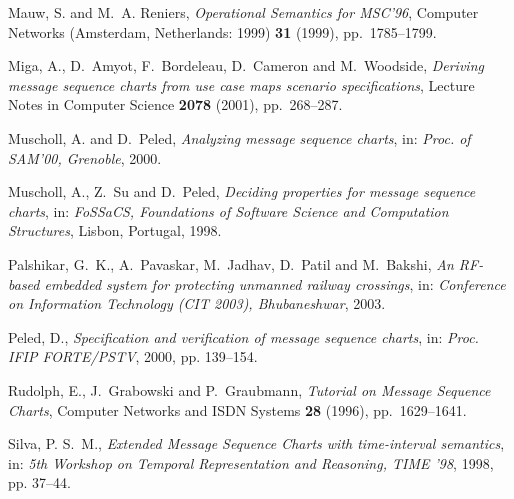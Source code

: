 \documentclass{entcs}
\begin{document}
\begin{thebibliography}{10}
Mauw, S. and M.~A. Reniers, \emph{Operational {Semantics} for {MSC'96}},
  Computer Networks (Amsterdam, Netherlands: 1999) \textbf{31} (1999),
  pp.~1785--1799.

Miga, A., D.~Amyot, F.~Bordeleau, D.~Cameron and M.~Woodside, \emph{Deriving
  message sequence charts from use case maps scenario specifications}, Lecture
  Notes in Computer Science \textbf{2078} (2001), pp.~268--287.

Muscholl, A. and D.~Peled, \emph{Analyzing message sequence charts}, in:
  \emph{Proc. of SAM'00, Grenoble}, 2000.

Muscholl, A., Z.~Su and D.~Peled, \emph{Deciding properties for message
  sequence charts}, in: \emph{FoSSaCS, Foundations of Software Science and
  Computation Structures}, Lisbon, Portugal, 1998.

Palshikar, G.~K., A.~Pavaskar, M.~Jadhav, D.~Patil and M.~Bakshi, \emph{An
  {RF}-based embedded system for protecting unmanned railway crossings}, in:
  \emph{Conference on Information Technology (CIT 2003), Bhubaneshwar}, 2003.

Peled, D., \emph{Specification and verification of message sequence charts},
  in: \emph{Proc. IFIP FORTE/PSTV}, 2000, pp. 139--154.

Rudolph, E., J.~Grabowski and P.~Graubmann, \emph{{Tutorial on Message Sequence
  Charts}}, Computer Networks and ISDN Systems \textbf{28} (1996),
  pp.~1629--1641.

Silva, P. S.~M., \emph{Extended {Message Sequence Charts} with time-interval
  semantics}, in: \emph{5th Workshop on Temporal Representation and Reasoning,
  TIME '98}, 1998, pp. 37--44.

\end{thebibliography}
\end{document}
